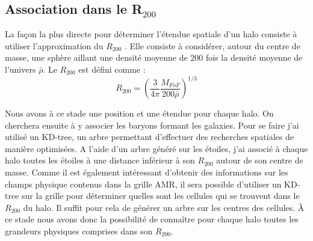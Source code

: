 \subsection{Association dans le R$_{200}$}

La façon la plus directe pour déterminer l'étendue spatiale d'un halo consiste à utiliser l'approximation du $R_{200}$ \citep{1997ApJ...490..493N}.
Elle consiste à considérer, autour du centre de masse, une sphère aillant une densité moyenne de $200$ fois la densité moyenne de l'univers $\bar{\rho}$.
Le $R_{200}$ est défini comme : 
\begin{equation}
R_{200}= \left( \frac{3}{4\pi} \frac{M_{FoF} }{200 \bar{\rho}}  \right)^{1/3}
\end{equation}




%

Nous avons à ce stade une position et une étendue pour chaque halo.
On cherchera ensuite à y associer les baryons formant les galaxies.
Pour se faire j'ai utilisé un KD-tree, un arbre permettant d'effectuer des recherches spatiales de manière optimisées.
A l'aide d'un arbre généré sur les étoiles, j'ai associé à chaque halo toutes les étoiles à une distance inférieur à son $R_{200}$ autour de son centre de masse.
Comme il est également intéressant d'obtenir des informations sur les champs physique contenus dans la grille \ac{AMR}, il sera possible d'utiliser un KD-tree sur la grille pour déterminer quelles sont les cellules qui se trouvent dans le $R_{200}$ du halo.
Il suffit pour cela de générer un arbre sur les centres des cellules.%
À ce stade nous avons donc la possibilité de connaître pour chaque halo toutes les grandeurs physiques comprises dans son $R_{200}$.

